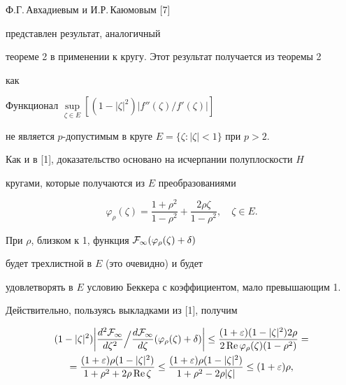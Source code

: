  


Ф.Г.\,Авхадиевым и И.Р.\,Каюмовым [7] 


представлен результат, аналогичный 


теореме 2 в применении к кругу. Этот результат  получается из теоремы 2 


как 


 


\begin{cornonum} 


Функционал $\sup\limits_{\zeta\in E}[(1-|\zeta|^2)|f''(\zeta)/f'(\zeta)|]$


не является $p$-допустимым в круге $E=\{\zeta:|\zeta|<1\}$ при $p>2$. 


\end{cornonum} 


 


Как и в [1], доказательство основано на исчерпании полуплоскости $H$ 


кругами, которые получаются из $E$ преобразованиями 


$$ 


\varphi_\rho(\zeta)=\frac{1+\rho^2}{1-\rho^2}+ 


\frac{2\rho\zeta}{1-\rho^2},\quad \zeta\in E. 


$$ 


При $\rho$, близком к 1, функция $\cal F_1(\varphi_\rho(\zeta)+\delta)$ 


будет трехлистной в $E$ (это очевидно) и будет 


удовлетворять в $E$ условию Беккера с коэффициентом, мало превышающим 1. 


Действительно, пользуясь выкладками из [1], получим 


\begin{multline*} 


(1-|\zeta|^2)\bigg|\frac{d^2\cal F_1}{d\zeta^2}\Big/ 


\frac{d\cal F_1}{d\zeta}(\varphi_\rho(\zeta)+\delta)\bigg|\le 


\frac{(1+\varepsilon)(1-|\zeta|^2)2\rho} 


{2\re\varphi_\rho(\zeta)(1-\rho^2)}= \\ 


=\frac{(1+\varepsilon)\rho(1-|\zeta|^2)} 


{1+\rho^2+2\rho\re\zeta}\le 


\frac{(1+\varepsilon)\rho(1-|\zeta|^2)} 


{1+\rho^2-2\rho|\zeta|}\le (1+\varepsilon)\rho, 


\end{multline*} 


